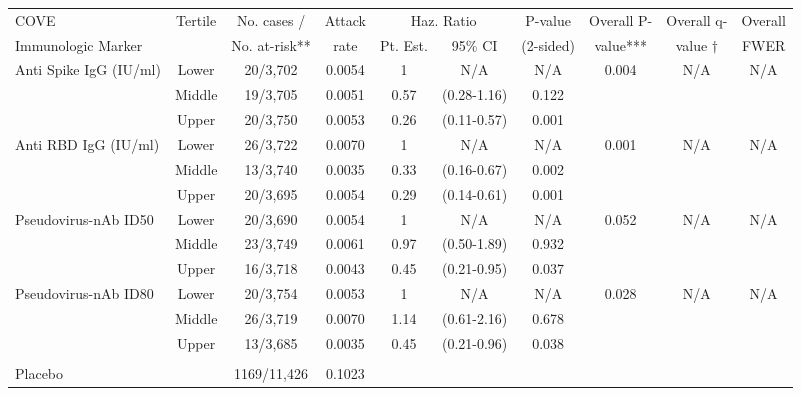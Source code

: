\begin{tabular}{lccccccccc}
   \hline
 
         \multicolumn{1}{l}{COVE} & \multicolumn{1}{c}{Tertile}   & \multicolumn{1}{c}{No. cases /}   & \multicolumn{1}{c}{Attack}   & \multicolumn{2}{c}{Haz. Ratio}                     & \multicolumn{1}{c}{P-value}   & \multicolumn{1}{c}{Overall P-}      & \multicolumn{1}{c}{Overall q-}   & \multicolumn{1}{c}{Overall} \\ 
         \multicolumn{1}{l}{Immunologic Marker}            & \multicolumn{1}{c}{}          & \multicolumn{1}{c}{No. at-risk**} & \multicolumn{1}{c}{rate}   & \multicolumn{1}{c}{Pt. Est.} & \multicolumn{1}{c}{95\% CI} & \multicolumn{1}{c}{(2-sided)} & \multicolumn{1}{c}{value***} & \multicolumn{1}{c}{value $\dagger$} & \multicolumn{1}{c}{FWER} \\ 
         \hline
 
    Anti Spike IgG (IU/ml) & Lower & 20/3,702 & 0.0054 & 1 & N/A & N/A & 0.004 & N/A & N/A \\ 
   & Middle & 19/3,705 & 0.0051 & 0.57 & (0.28-1.16) & 0.122 &     &  &  \\ 
   & Upper & 20/3,750 & 0.0053 & 0.26 & (0.11-0.57) & 0.001 &     &  &  \\ 
  Anti RBD IgG (IU/ml) & Lower & 26/3,722 & 0.0070 & 1 & N/A & N/A & 0.001 & N/A & N/A \\ 
   & Middle & 13/3,740 & 0.0035 & 0.33 & (0.16-0.67) & 0.002 &     &  &  \\ 
   & Upper & 20/3,695 & 0.0054 & 0.29 & (0.14-0.61) & 0.001 &     &  &  \\ 
  Pseudovirus-nAb ID50 & Lower & 20/3,690 & 0.0054 & 1 & N/A & N/A & 0.052 & N/A & N/A \\ 
   & Middle & 23/3,749 & 0.0061 & 0.97 & (0.50-1.89) & 0.932 &     &  &  \\ 
   & Upper & 16/3,718 & 0.0043 & 0.45 & (0.21-0.95) & 0.037 &     &  &  \\ 
  Pseudovirus-nAb ID80 & Lower & 20/3,754 & 0.0053 & 1 & N/A & N/A & 0.028 & N/A & N/A \\ 
   & Middle & 26/3,719 & 0.0070 & 1.14 & (0.61-2.16) & 0.678 &     &  &  \\ 
   & Upper & 13/3,685 & 0.0035 & 0.45 & (0.21-0.96) & 0.038 &     &  &  \\ 
    
 \multicolumn{8}{l}{} \\ 

 \multicolumn{2}{l}{Placebo} & 1169/11,426&0.1023&\multicolumn{4}{l}{}  \\ 
 \hline
\end{tabular}
